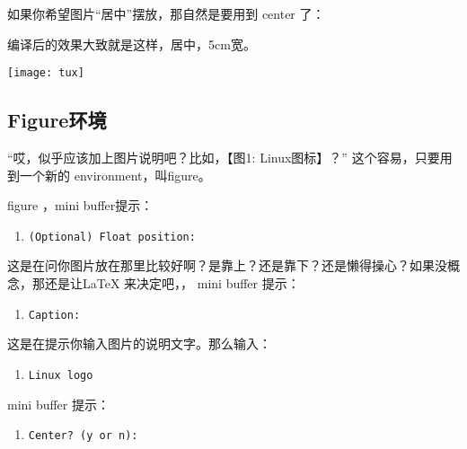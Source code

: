 如果你希望图片“居中”摆放，那自然是要用到 center 了：

\begin{codeblock}[.9]
\end{codeblock}

编译后的效果大致就是这样，居中，5cm宽。

\begin{center}
  \texttt{[image: tux]}
\end{center}

\subsection{Figure环境}
\label{sec:figure}

“哎，似乎应该加上图片说明吧？比如，【图1: Linux图标】？” 这个容易，只要用到一个新的
environment，叫figure。

 figure ，mini buffer提示：
\begin{enumerate}
\item[] \texttt{(Optional) Float position:}
\end{enumerate}

这是在问你图片放在那里比较好啊？是靠上？还是靠下？还是懒得操心？如果没概念，那还是让LaTeX
来决定吧，， mini buffer 提示：

\begin{enumerate}
\item[] \texttt{Caption:}
\end{enumerate}

这是在提示你输入图片的说明文字。那么输入：

\begin{enumerate}
\item[] \texttt{Linux logo}
\end{enumerate}

mini buffer 提示：

\begin{enumerate}
\item[] \texttt{Center? (y or n):} 
\end{enumerate}

